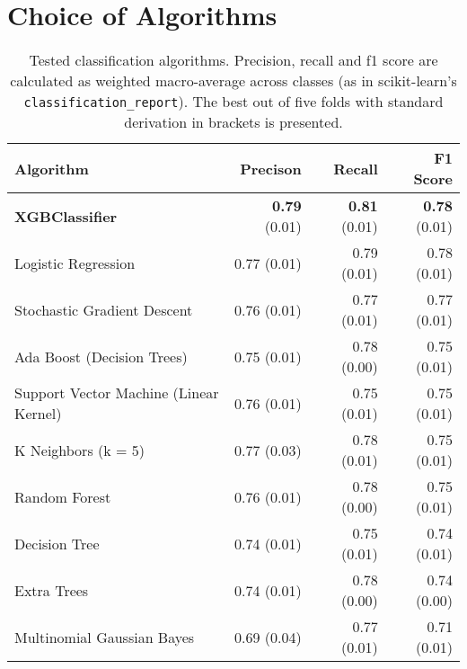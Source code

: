 \section{Choice of Algorithms}
\begin{table}[!h]
\centering

\caption{Tested classification algorithms. Precision, recall and f1 score are calculated as weighted macro-average across classes (as in scikit-learn's \texttt{classification\_report}). The best out of five folds with standard derivation in brackets is presented.}
\label{tbl:algo}
\begin{tabularx}{\textwidth}{Xrrr}
\toprule
Algorithm & Precison & Recall & F1 Score \\ \midrule
\textbf{XGBClassifier} 	&	 \textbf{0.79} \scriptsize{(0.01)} &  \textbf{0.81} \scriptsize{(0.01)} &  \textbf{0.78} \scriptsize{(0.01)}  \\

Logistic Regression 	&	 0.77 \scriptsize{(0.01)} &	 0.79 \scriptsize{(0.01)} &	 0.78 \scriptsize{(0.01)}  \\ 


Stochastic Gradient Descent 	&	 0.76 \scriptsize{(0.01)} &	 0.77 \scriptsize{(0.01)} &	 0.77 \scriptsize{(0.01)}  \\ 

Ada Boost (Decision Trees) 	&	 0.75 \scriptsize{(0.01)} &	 0.78 \scriptsize{(0.00)} &	 0.75 \scriptsize{(0.01)}  \\ 

Support Vector Machine (Linear Kernel) &	 0.76 \scriptsize{(0.01)} &	 0.75 \scriptsize{(0.01)} &	 0.75 \scriptsize{(0.01)}  \\ 


K Neighbors (k = 5) &	 0.77 \scriptsize{(0.03)} &	 0.78 \scriptsize{(0.01)} &	 0.75 \scriptsize{(0.01)}  \\ 


Random Forest &	 0.76 \scriptsize{(0.01)} &	 0.78 \scriptsize{(0.00)} &	 0.75 \scriptsize{(0.01)}  \\ 

Decision Tree &	 0.74 \scriptsize{(0.01)} &	 0.75 \scriptsize{(0.01)} &	 0.74 \scriptsize{(0.01)}  \\ 

Extra Trees 	&	 0.74 \scriptsize{(0.01)} &	 0.78 \scriptsize{(0.00)} &	 0.74 \scriptsize{(0.00)}  \\ 

Multinomial Gaussian Bayes &	 0.69 \scriptsize{(0.04)} &	 0.77 \scriptsize{(0.01)} &	 0.71 \scriptsize{(0.01)}  \\ 



\end{tabularx}
\end{table}
